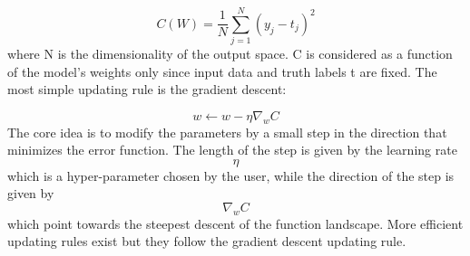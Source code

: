 \documentclass[a4paper, 10pt]{book}
\begin{document}
\begin{equation}
    \label{eqn:cost_function}
C(W) = \frac{1}{N} \sum \limits_{j=1}^N (y_j - t_j)^2
\end{equation}
where N is the dimensionality of the output space. C is considered as a function of the model's weights only since input data and truth labels t are fixed. The most simple updating rule is the gradient descent:

\begin{equation}
    \label{eqn:updat_g_discent}
w  \leftarrow   w-\eta \nabla_w C
\end{equation}
The core idea is to modify the parameters by a small step in the direction that minimizes the error function. The length of the step is given by the learning rate $$\eta  $$ which is a hyper-parameter chosen by the user, while the direction of the step is given by $$ \nabla_w C $$ which point towards the steepest descent of the function landscape.
More efficient updating rules exist but they follow the gradient descent updating rule.
\end{document}
